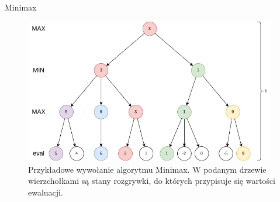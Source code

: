 \begin{frame}{Minimax}
	
	\begin{figure}
		\centering
		\includegraphics[width=11cm]{figures/minimax_przebieg.png}
		\caption{Przykładowe wywołanie algorytmu Minimax. W podanym drzewie wierzchołkami są stany rozgrywki, do których przypisuje się wartości ewaluacji.}
	\end{figure}

\end{frame}

